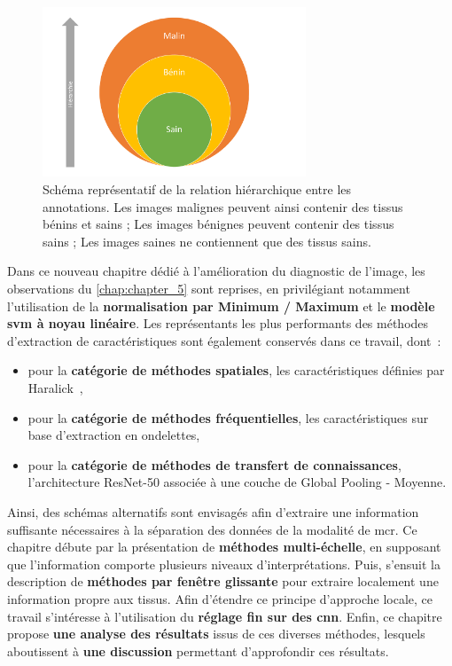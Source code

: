 \begin{figure}[H]
    \centering
    \includegraphics[width=0.7\textwidth]{contents/chapter_6/resources/scheme_image_improvement_annotations_hierarchy.pdf}
    \caption{Schéma représentatif de la relation hiérarchique entre les annotations. Les images malignes peuvent ainsi contenir des tissus bénins et sains ; Les images bénignes peuvent contenir des tissus sains ; Les images saines ne contiennent que des tissus sains.}
    \label{fig:scheme_image_improvement_annotations_hierarchy}
\end{figure}\par

Dans ce nouveau chapitre dédié à l'amélioration du diagnostic de l'image, les observations du \cref{chap:chapter_5} sont reprises, en privilégiant notamment l'utilisation de la \textbf{normalisation par Minimum / Maximum} et le \textbf{modèle \gls{svm} à noyau linéaire}. Les représentants les plus performants des méthodes d'extraction de caractéristiques sont également conservés dans ce travail, dont~:
\begin{itemize}
    \item pour la \textbf{catégorie de méthodes spatiales}, les caractéristiques définies par Haralick~,
    \item pour la \textbf{catégorie de méthodes fréquentielles}, les caractéristiques sur base d'extraction en ondelettes,
    \item pour la \textbf{catégorie de méthodes de transfert de connaissances}, l'architecture ResNet-50 associée à une couche de Global Pooling - Moyenne.
\end{itemize}\par

Ainsi, des schémas alternatifs sont envisagés afin d'extraire une information suffisante nécessaires à la séparation des données de la modalité de \gls{mcr}. Ce chapitre débute par la présentation de \textbf{méthodes multi-échelle}, en supposant que l'information comporte plusieurs niveaux d'interprétations. Puis, s'ensuit la description de \textbf{méthodes par fenêtre glissante} pour extraire localement une information propre aux tissus. Afin d'étendre ce principe d'approche locale, ce travail s'intéresse à l'utilisation du \textbf{réglage fin sur des \gls{cnn}}. Enfin, ce chapitre propose \textbf{une analyse des résultats} issus de ces diverses méthodes, lesquels aboutissent à \textbf{une discussion} permettant d'approfondir ces résultats.\par
\clearpage

